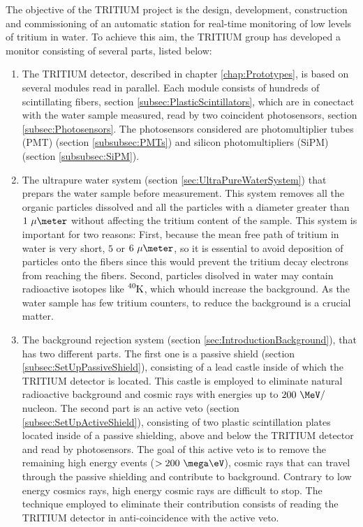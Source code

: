 The objective of the TRITIUM project is the design, development, construction and commissioning of an automatic station for real-time monitoring of low levels of tritium in water. To achieve this aim, the TRITIUM group has developed a monitor consisting of several parts, listed below: 

\begin{enumerate}

\item{} The TRITIUM detector, described in chapter \ref{chap:Prototypes}, is based on several modules read in parallel. Each module consists of hundreds of scintillating fibers, section \ref{subsec:PlasticScintillators}, which are in conectact with the water sample measured, read by two coincident photosensors, section \ref{subsec:Photosensors}. The photosensors considered are photomultiplier tubes (PMT) (section \ref{subsubsec:PMTs}) and silicon photomultipliers (SiPM) (section \ref{subsubsec:SiPM}).

\item{} The ultrapure water system (section \ref{sec:UltraPureWaterSystem}) that prepars the water sample before measurement. This system removes all the organic particles dissolved and all the particles with a diameter greater than $1~\mu\meter$ without affecting the tritium content of the sample. This system is important for two reasons: First, because the mean free path of tritium in water is very short, $5$ or $6~\mu\meter$,  so it is essential to avoid deposition of particles onto the fibers since this would prevent the tritium decay electrons from reaching the fibers. Second, particles disolved in water may contain radioactive isotopes like $\ce{^{40}K}$, which whould increase the background. As the water sample has few tritium counters, to reduce the background is a crucial matter.

\item{} The background rejection system (section \ref{sec:IntroductionBackground}), that has two different parts. The first one is a passive shield (section \ref{subsec:SetUpPassiveShield}), consisting of a lead castle inside of which the TRITIUM detector is located. This castle is employed to eliminate natural radioactive background and cosmic rays with energies up to $200~\MeV/$nucleon. The second part is an active veto (section \ref{subsec:SetUpActiveShield}), consisting of two plastic scintillation plates located inside of a passive shielding, above and below the TRITIUM detector and read by photosensors. The goal of this active veto is to remove the remaining high energy events ($>200~\mega\eV$), cosmic rays that can travel through the passive shielding and contribute to background. Contrary to low energy cosmics rays, high energy cosmic rays are difficult to stop. The technique employed to eliminate their contribution consists of reading the TRITIUM detector in anti-coincidence with the active veto.


\end{enumerate}
